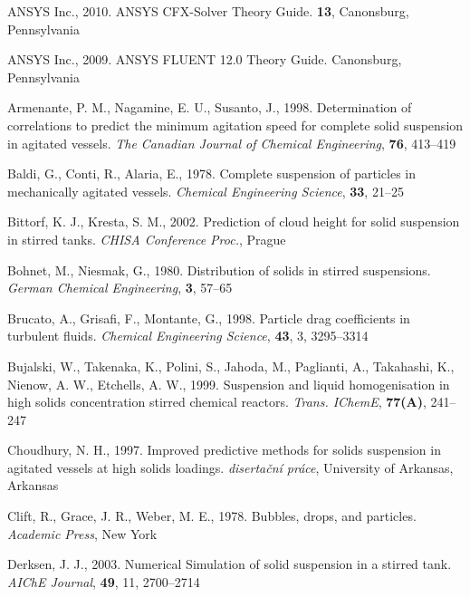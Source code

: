 \begin{thebibliography}{99}

 ANSYS Inc., 2010. ANSYS CFX-Solver Theory Guide. \textbf{13}, Canonsburg, Pennsylvania

 ANSYS Inc., 2009. ANSYS FLUENT 12.0 Theory Guide. Canonsburg, Pennsylvania

 Armenante, P. M., Nagamine, E. U., Susanto, J., 1998. Determination of correlations to predict the minimum agitation speed for complete solid suspension in agitated vessels. \textit{The Canadian Journal of Chemical Engineering}, \textbf{76}, 413--419

 Baldi, G., Conti, R., Alaria, E., 1978. Complete suspension of particles in mechanically agitated vessels. \textit{Chemical Engineering Science}, \textbf{33}, 21--25 

 Bittorf, K. J., Kresta, S. M., 2002. Prediction of cloud height for solid suspension in stirred tanks. \textit{CHISA Conference Proc.}, Prague

 Bohnet, M., Niesmak, G., 1980. Distribution of solids in stirred suspensions. \textit{German
Chemical Engineering}, \textbf{3}, 57--65

 Brucato, A., Grisafi, F., Montante, G., 1998. Particle drag coefficients in turbulent fluids. \textit{Chemical Engineering Science}, \textbf{43}, 3, 3295--3314

 Bujalski, W., Takenaka, K., Polini, S., Jahoda, M., Paglianti, A., Takahashi, K., Nienow, A. W., Etchells, A. W., 1999. Suspension and liquid homogenisation in high solids concentration stirred chemical reactors. \textit{Trans. IChemE}, \textbf{77(A)}, 241--247

 Choudhury, N. H., 1997. Improved predictive methods for solids suspension in agitated vessels at high solids loadings. \textit{disertační práce},  University of Arkansas, Arkansas

 Clift, R., Grace, J. R., Weber, M. E.,  1978.  Bubbles, drops, and particles. \textit{Academic Press}, New York

 Derksen, J. J., 2003. Numerical Simulation of solid suspension in a stirred tank. \textit{AIChE Journal}, \textbf{49}, 11, 2700--2714


\end{thebibliography}
